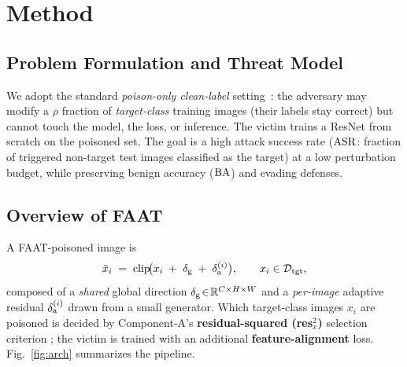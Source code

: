 \section{Method}
\label{sec:method}

\subsection{Problem Formulation and Threat Model}
\label{sec:threat}
We adopt the standard \emph{poison-only clean-label} setting~\cite{generalcomponents2025}:
the adversary may modify a $\rho$ fraction of \emph{target-class} training images
(their labels stay correct) but cannot touch the model, the loss, or inference.
The victim trains a ResNet from scratch on the poisoned set. The goal is a high
attack success rate ($\mathrm{ASR}$: fraction of triggered non-target test images
classified as the target) at a low perturbation budget, while preserving benign
accuracy ($\mathrm{BA}$) and evading defenses.

\subsection{Overview of FAAT}
\label{sec:overview}


A FAAT-poisoned image is
\begin{equation}
\tilde{x}_i \;=\; \mathrm{clip}\!\big(x_i \;+\; \delta_{\mathrm{g}} \;+\; \delta_{\mathrm{a}}^{(i)}\big),
\qquad x_i \in \mathcal{D}_{\mathrm{tgt}},
\label{eq:poison}
\end{equation}
composed of a \emph{shared} global direction $\delta_{\mathrm{g}}\!\in\!\mathbb{R}^{C\times H\times W}$
and a \emph{per-image} adaptive residual $\delta_{\mathrm{a}}^{(i)}$ drawn from a small generator.
Which target-class images $x_i$ are poisoned is decided by Component-A's
\textbf{residual-squared (res$_x^2$)} selection criterion
\cite{generalcomponents2025}; the victim is trained with an additional
\textbf{feature-alignment} loss. Fig.~\ref{fig:arch} summarizes the pipeline.

